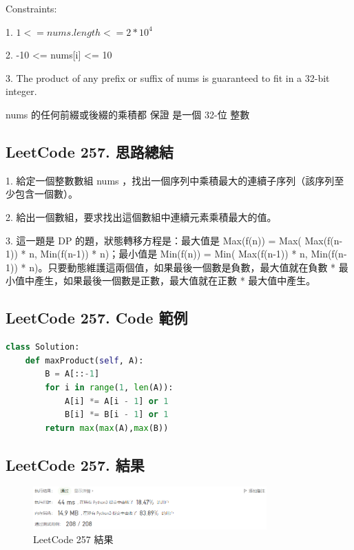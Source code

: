\documentclass[10pt,UTF8]{ctexart}
\begin{document}
Constraints:

1. $1 <= nums.length <= 2 * 10^{4}$

2. -10 <= nums[i] <= 10

3. The product of any prefix or suffix of nums is guaranteed to fit in a 32-bit integer.

nums 的任何前綴或後綴的乘積都 保證 是一個 32-位 整數

\subsection{LeetCode 257. 思路總結}

1. 給定一個整數數組 nums ，找出一個序列中乘積最大的連續子序列（該序列至少包含一個數）。

2. 給出一個數組，要求找出這個數組中連續元素乘積最大的值。

3. 這一題是 DP 的題，狀態轉移方程是：最大值是 Max(f(n)) = Max( Max(f(n-1)) * n, Min(f(n-1)) * n)；最小值是 Min(f(n)) = Min( Max(f(n-1)) * n, Min(f(n-1)) * n)。只要動態維護這兩個值，如果最後一個數是負數，最大值就在負數 * 最小值中產生，如果最後一個數是正數，最大值就在正數 * 最大值中產生。

\subsection{LeetCode 257. Code 範例}

\begin{lstlisting}[language={python}]
class Solution:
    def maxProduct(self, A):
        B = A[::-1]
        for i in range(1, len(A)):
            A[i] *= A[i - 1] or 1
            B[i] *= B[i - 1] or 1
        return max(max(A),max(B)) 
\end{lstlisting}

\subsection{LeetCode 257. 結果}

\begin{figure}[H]
\centering 
\includegraphics[width=0.80\textwidth]{lc-257-o.png} 
\caption{LeetCode 257 結果}
\label{Test}
\end{figure}










\clearpage
\end{document}
